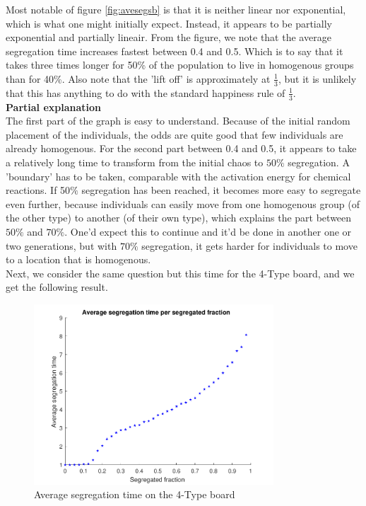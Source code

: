 Most notable of figure \ref{fig:avesegsb} is that it is neither linear nor exponential, which is what one might initially expect. Instead, it appears to be partially exponential and partially lineair. From the figure, we note that the average segregation time increases fastest between 0.4 and 0.5. 
Which is to say that it takes three times longer for 50\% of the population to live in homogenous groups than for 40\%.
Also note that the 'lift off' is approximately at $\frac{1}{3}$, but it is unlikely that this has anything to do with the standard happiness rule of $\frac{1}{3}$.\\

\textbf{Partial explanation} \\
The first part of the graph is easy to understand. 
Because of the initial random placement of the individuals, the odds are quite good that few individuals are already homogenous.
For the second part between 0.4 and 0.5, it appears to take a relatively long time to transform from the initial chaos to $50\%$ segregation. A 'boundary' has to be taken, comparable with the activation energy for chemical reactions.
If 50$\%$ segregation has been reached, it becomes more easy to segregate even further, because individuals can easily move from one homogenous group (of the other type) to another (of their own type), which explains the part between $50\%$ and $70\%$. One'd expect this to continue and it'd be done in another one or two generations, but with $70\%$ segregation, it gets harder for individuals to move to a location that is homogenous.\\

Next, we consider the same question but this time for the 4-Type board, and we get the following result.


 \begin{figure}[H]
    \centering
    \includegraphics[width=0.8\textwidth]{aveseg_4b_2}
    \caption{Average segregation time on the 4-Type board}
    \label{fig:aveseg4b}
\end{figure}

